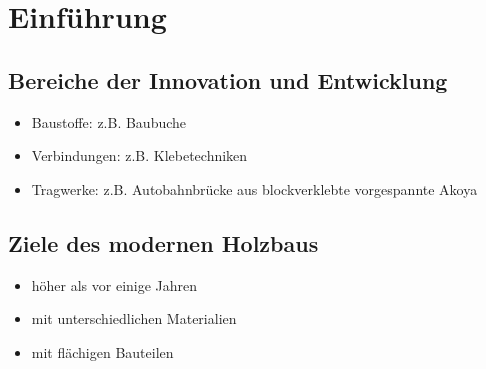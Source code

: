 \documentclass[fleqn,twoside]{article}
\title{\Huge{\textfrak{Innovationen und Entwicklungen im Holzbau}}}
\author{\calligra{Jonas Konrad}}
\date{\textfrak{\today}}
\begin{document}
\parindent 0pt
\fancyfoot[R]{\frakfamily }
\maketitle \thispagestyle{empty}
\begin{center}
\end{center}
\tableofcontents
\newpage




\section{Einführung}

\subsection{Bereiche der Innovation und Entwicklung}
    \begin{itemize}
        \item Baustoffe: z.B. Baubuche
        \item Verbindungen: z.B. Klebetechniken
        \item Tragwerke: z.B. Autobahnbrücke aus blockverklebte vorgespannte Akoya
    \end{itemize}

\subsection{Ziele des modernen Holzbaus}
    \begin{itemize}
        \item höher als vor einige Jahren
        \item mit unterschiedlichen Materialien
        \item mit flächigen Bauteilen
    \end{itemize}
\end{document}
